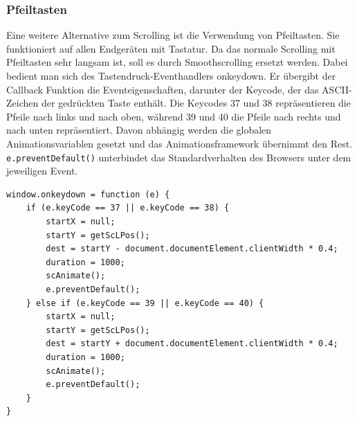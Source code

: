 \subsubsection{Pfeiltasten}
Eine weitere Alternative zum Scrolling ist die Verwendung von Pfeiltasten. Sie funktioniert auf allen Endgeräten mit Tastatur. Da das normale Scrolling mit Pfeiltasten sehr langsam ist, soll es durch Smoothscrolling ersetzt werden. Dabei bedient man sich des Tastendruck-Eventhandlers onkeydown. Er übergibt der Callback Funktion die Eventeigenschaften, darunter der Keycode, der das ASCII-Zeichen der gedrückten Taste enthält. Die Keycodes 37 und 38 repräsentieren die Pfeile nach links und nach oben, während 39 und 40 die Pfeile nach rechts und nach unten repräsentiert. Davon abhängig werden die globalen Animationsvariablen gesetzt und das Animationsframework übernimmt den Rest. \lstinline{e.preventDefault()} unterbindet das Standardverhalten des Browsers unter dem jeweiligen Event.

 \begin{lstlisting}[caption=Abfangen des Tastendrücken durch das onkeydown-Event, label=js_mousewheel]
window.onkeydown = function (e) {
	if (e.keyCode == 37 || e.keyCode == 38) {
		startX = null;
		startY = getScLPos();
		dest = startY - document.documentElement.clientWidth * 0.4;
		duration = 1000;
		scAnimate();
		e.preventDefault();
	} else if (e.keyCode == 39 || e.keyCode == 40) {
		startX = null;
		startY = getScLPos();
		dest = startY + document.documentElement.clientWidth * 0.4;
		duration = 1000;
		scAnimate();
		e.preventDefault();
	}
}
\end{lstlisting} 
